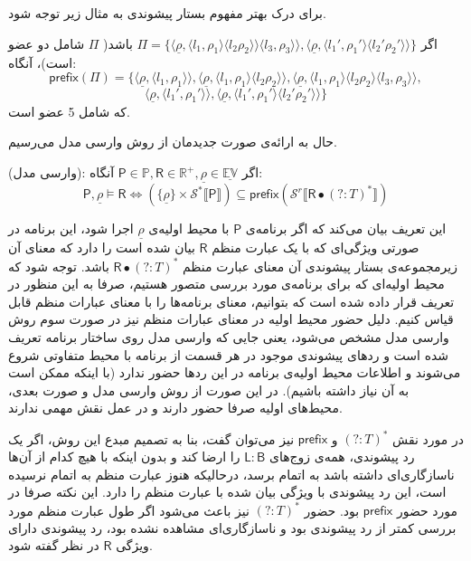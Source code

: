 برای درک بهتر مفهوم بستار پیشوندی به مثال زیر توجه شود.
\begin{exm}
	اگر 
	$\Pi = \{\langle\underline{\rho},\langle l_1 , \rho_1 \rangle 
	\langle l_2  \rho_2 \rangle\rangle  \langle l_3 , \rho_3 \rangle\rangle 
	,
	\langle\underline{\rho},\langle {l_1}' , {\rho_1}' \rangle  \langle {l_2}'  {\rho_2}' \rangle\rangle
	\}$
	باشد( $\Pi$ شامل دو عضو است)، آنگاه:
	$$
	\mathsf{prefix}(\Pi)=
	\{
	\langle\underline{\rho},\langle l_1 , \rho_1 \rangle\rangle ,
	\langle\underline{\rho},\langle l_1 , \rho_1 \rangle  \langle l_2  \rho_2 \rangle\rangle,
	\langle\underline{\rho},\langle l_1 , \rho_1 \rangle  \langle l_2  \rho_2 \rangle  \langle l_3 , \rho_3 \rangle\rangle ,$$
	$$
	\langle\underline{\rho},\langle {l_1}' , {\rho_1}' \rangle\rangle,
	\langle\underline{\rho},\langle {l_1}' , {\rho_1}' \rangle  \langle {l_2}'  {\rho_2}' \rangle\rangle
	\}
	$$
	که شامل 5 عضو است.
\end{exm}
حال به ارائه‌ی صورت جدیدمان از روش وارسی مدل می‌رسیم.
\begin{defn}
(وارسی مدل):
	اگر 
	$\mathsf{P}\in\mathbb{P} , \mathsf{R} \in \mathbb{R}^+ , \underline{\rho} \in \underline{\mathbb{EV}}$
	آنگاه:
	$$\mathsf{P},\underline{\rho} \models \mathsf{R}
	 \Leftrightarrow
	(\{\underline{\rho}\}\times \mathcal{S}^* \llbracket\mathsf{P}\rrbracket) \subseteq 
	\mathsf{prefix} (\mathcal{S}^r \llbracket\mathsf{R} \bullet (?:\mathit{T})^*\rrbracket)
	$$
\end{defn}

این تعریف بیان می‌کند که اگر برنامه‌ی 
$\mathsf{P}$
با محیط اولیه‌ی 
$\underline{\rho}$
اجرا شود، این برنامه در صورتی ویژگی‌ای که با یک عبارت منظم 
$\mathsf{R}$
بیان شده است را دارد که معنای آن زیرمجموعه‌ی بستار پیشوندی آن معنای عبارت منظم
$\mathsf{R} \bullet (?:\mathit{T})^*$
باشد.
توجه شود که محیط اولیه‌ای که برای برنامه‌ی مورد بررسی متصور هستیم، صرفا به این منظور در تعریف قرار داده شده است که بتوانیم،  معنای برنامه‌ها را با معنای عبارات منظم قابل قیاس کنیم. دلیل حضور محیط اولیه در معنای عبارات منظم نیز در صورت سوم روش وارسی مدل مشخص می‌شود، یعنی جایی که وارسی مدل روی ساختار برنامه تعریف شده است و ردهای پیشوندی موجود در هر قسمت از برنامه با محیط متفاوتی شروع می‌شوند و اطلاعات محیط اولیه‌ی برنامه در این ردها حضور ندارد (با اینکه ممکن است به آن نیاز داشته باشیم). در این صورت از روش وارسی مدل و صورت بعدی، محیط‌های اولیه صرفا حضور دارند و در عمل نقش مهمی ندارند. 

در مورد نقش 
$ (?:\mathit{T})^*$
و
$ \mathsf{prefix} $
نیز می‌توان گفت، بنا به تصمیم مبدع این روش، اگر یک رد پیشوندی، همه‌ی زوج‌های 
$\mathsf{L:B}$
را ارضا کند و بدون اینکه با هیچ کدام از آن‌‌ها ناسازگاری‌ای داشته باشد به اتمام برسد، درحالیکه هنوز عبارت منظم به اتمام نرسیده است، این رد پیشوندی با ویژگی بیان شده با عبارت منظم را دارد. این نکته صرفا در مورد حضور 
$\mathsf{prefix}$ 
بود. حضور 
$(?:\mathit{T})^*$
نیز باعث می‌شود اگر طول عبارت منظم مورد بررسی کمتر از رد پیشوندی بود و ناسازگاری‌ای مشاهده نشده بود، رد پیشوندی دارای ویژگی $\mathsf{R}$ در نظر گفته شود.
